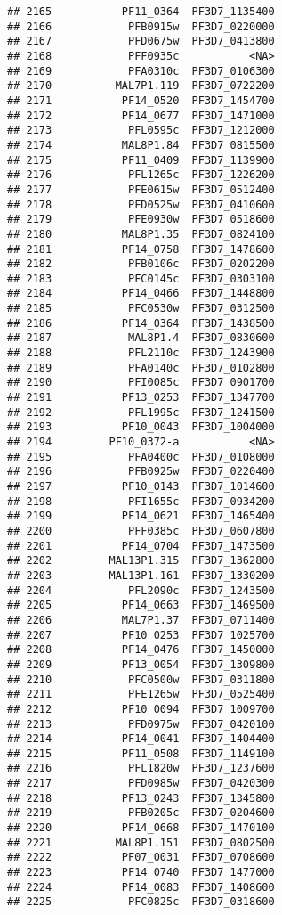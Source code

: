 \documentclass[12pt, a4paper]{article}\usepackage[]{graphicx}\usepackage[]{color}
\makeatletter
\newenvironment{kframe}{%
 \def\at@end@of@kframe{}%
 \ifinner\ifhmode%
  \def\at@end@of@kframe{\end{minipage}}%
  \begin{minipage}{\columnwidth}%
 \fi\fi%
 \def\FrameCommand##1{\hskip\@totalleftmargin \hskip-\fboxsep
 \colorbox{shadecolor}{##1}\hskip-\fboxsep
     \hskip-\linewidth \hskip-\@totalleftmargin \hskip\columnwidth}%
 \MakeFramed {\advance\hsize-\width
   \@totalleftmargin\z@ \linewidth\hsize
   \@setminipage}}%
 {\par\unskip\endMakeFramed%
 \at@end@of@kframe}
\newenvironment{knitrout}{}{} %
\makeatother
\begin{document}
\begin{knitrout}
\begin{kframe}
\begin{verbatim}
## 2165           PF11_0364  PF3D7_1135400
## 2166            PFB0915w  PF3D7_0220000
## 2167            PFD0675w  PF3D7_0413800
## 2168            PFF0935c           <NA>
## 2169            PFA0310c  PF3D7_0106300
## 2170          MAL7P1.119  PF3D7_0722200
## 2171           PF14_0520  PF3D7_1454700
## 2172           PF14_0677  PF3D7_1471000
## 2173            PFL0595c  PF3D7_1212000
## 2174           MAL8P1.84  PF3D7_0815500
## 2175           PF11_0409  PF3D7_1139900
## 2176            PFL1265c  PF3D7_1226200
## 2177            PFE0615w  PF3D7_0512400
## 2178            PFD0525w  PF3D7_0410600
## 2179            PFE0930w  PF3D7_0518600
## 2180           MAL8P1.35  PF3D7_0824100
## 2181           PF14_0758  PF3D7_1478600
## 2182            PFB0106c  PF3D7_0202200
## 2183            PFC0145c  PF3D7_0303100
## 2184           PF14_0466  PF3D7_1448800
## 2185            PFC0530w  PF3D7_0312500
## 2186           PF14_0364  PF3D7_1438500
## 2187            MAL8P1.4  PF3D7_0830600
## 2188            PFL2110c  PF3D7_1243900
## 2189            PFA0140c  PF3D7_0102800
## 2190            PFI0085c  PF3D7_0901700
## 2191           PF13_0253  PF3D7_1347700
## 2192            PFL1995c  PF3D7_1241500
## 2193           PF10_0043  PF3D7_1004000
## 2194         PF10_0372-a           <NA>
## 2195            PFA0400c  PF3D7_0108000
## 2196            PFB0925w  PF3D7_0220400
## 2197           PF10_0143  PF3D7_1014600
## 2198            PFI1655c  PF3D7_0934200
## 2199           PF14_0621  PF3D7_1465400
## 2200            PFF0385c  PF3D7_0607800
## 2201           PF14_0704  PF3D7_1473500
## 2202         MAL13P1.315  PF3D7_1362800
## 2203         MAL13P1.161  PF3D7_1330200
## 2204            PFL2090c  PF3D7_1243500
## 2205           PF14_0663  PF3D7_1469500
## 2206           MAL7P1.37  PF3D7_0711400
## 2207           PF10_0253  PF3D7_1025700
## 2208           PF14_0476  PF3D7_1450000
## 2209           PF13_0054  PF3D7_1309800
## 2210            PFC0500w  PF3D7_0311800
## 2211            PFE1265w  PF3D7_0525400
## 2212           PF10_0094  PF3D7_1009700
## 2213            PFD0975w  PF3D7_0420100
## 2214           PF14_0041  PF3D7_1404400
## 2215           PF11_0508  PF3D7_1149100
## 2216            PFL1820w  PF3D7_1237600
## 2217            PFD0985w  PF3D7_0420300
## 2218           PF13_0243  PF3D7_1345800
## 2219            PFB0205c  PF3D7_0204600
## 2220           PF14_0668  PF3D7_1470100
## 2221          MAL8P1.151  PF3D7_0802500
## 2222           PF07_0031  PF3D7_0708600
## 2223           PF14_0740  PF3D7_1477000
## 2224           PF14_0083  PF3D7_1408600
## 2225            PFC0825c  PF3D7_0318600

\end{verbatim}
\end{kframe}
\end{knitrout}
\end{document}
